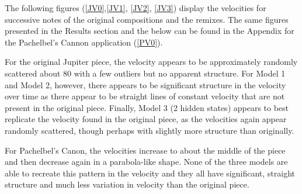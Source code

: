 \documentclass{article} %
\begin{document}
The following figures (\autoref{JV0},\autoref{JV1}, \autoref{JV2}, \autoref{JV3}) display the velocities for successive notes of the original compositions and the remixes. The same figures presented in the Results section and the below can be found in the Appendix for the Pachelbel's Cannon application (\autoref{PV0}). 


For the original Jupiter piece, the velocity appears to be approximately randomly scattered about 80 with a few outliers but no apparent structure.  For Model 1 and Model 2, however, there appears to be significant structure in the velocity over time as there appear to be straight lines of constant velocity that are not present in the original piece.  Finally, Model 3 (2 hidden states) appears to best replicate the velocity found in the original piece, as the velocities again appear randomly scattered, though perhaps with slightly more structure than originally.

For Pachelbel's Canon, the velocities increase to about the middle of the piece and then decrease again in a parabola-like shape.  None of the three models are able to recreate this pattern in the velocity and they all have significant, straight structure and much less variation in velocity than the original piece.
\end{document}
